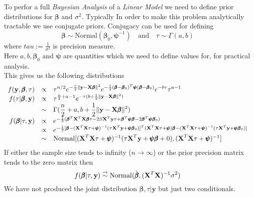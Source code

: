 \documentclass[11pt,a4paper]{article}
\begin{document}
To perfor a full \textit{Bayesian Analysis} of a \textit{Linear Model} we need to define prior distributions for $\pmb\beta$ and $\sigma^2$. Typically
In order to make this problem analytically tractable we use conjugate priors. Conjugacy can be used for defining
$$\pmb\beta\sim\text{Normal}(\pmb\beta_0,\pmb\psi^{-1})\quad\text{and}\quad\tau\sim\Gamma(a,b)$$
where $tau:=\frac1{\sigma^2}$ is precision measure.\\
Here $a,b,\pmb\beta_0\text{ and }\pmb\psi$ are quantities which we need to define values for, for practical analysis.\\
This gives us the following distributions
\[\begin{array}{rcl}
f(\textbf{y},\pmb\beta,\tau)&\propto&{\displaystyle\tau^{n/2}e^{-\frac{\tau}{2}\|\textbf{y}-\textbf{X}\pmb\beta\|^2}e^{-\frac12(\pmb\beta-\pmb\beta_0)^T\pmb\psi(\pmb\beta-\pmb\beta_0)}e^{-b\tau}\tau^{a-1}}\\
f(\tau|\pmb\beta,\textbf{y})&\propto&{\displaystyle\tau^{\frac{n}2+a-1}e^{-\tau(b+\frac12\|\textbf{y}-\textbf{X}\pmb\beta\|^2)}}\\
&\sim&{\displaystyle\Gamma(\frac{n}2+a,b+\frac12\|\textbf{y}-\textbf{X}\pmb\beta\|^2)}\\
f(\pmb\beta|\tau,\textbf{y})&\propto&e^{-\frac12(\pmb\beta^T\textbf{X}^T\textbf{X}\pmb\beta\tau-2\beta\textbf{X}^T\textbf{y}\tau+\pmb\beta^T\pmb\psi\pmb\beta-2\pmb\beta^T\pmb\psi\pmb\beta_0)}\\
&\propto&e^{-\frac12[\pmb\beta-(\textbf{X}^T\textbf{X}\tau+\pmb\psi)^{-1}(\tau\textbf{X}^T\textbf{y}+\pmb\psi\pmb\beta_0)]^T(\textbf{X}^T\textbf{X}\tau+\pmb\psi)\pmb\beta-(\textbf{X}^T\textbf{X}\tau+\pmb\psi)^{-1}(\tau\textbf{X}^T\textbf{y}+\pmb\psi\pmb\beta_0)]}\\
&\sim&\text{Normal}[(\textbf{X}^T\textbf{X}\tau+\pmb\psi)^{-1}(\tau\textbf{X}^T\textbf{y}+\pmb\psi\pmb\beta+0),(\textbf{X}^T\textbf{X}\tau+\pmb\psi)^{-1}]
\end{array}\]
If either the sample size tends to infinity (\ie $n\to\infty$) or the prior precision matrix tends to the zero matrix then
$$f(\pmb\beta|\tau,\textbf{y})\overset\to\sim\text{Normal}(\hat{\pmb\beta},(\textbf{X}^T\textbf{X})^{-1}\sigma^2)$$
\nb We have not produced the joint distribution $\pmb\beta,\tau|\textbf{y}$ but just two conditionals.\\
\end{document}
